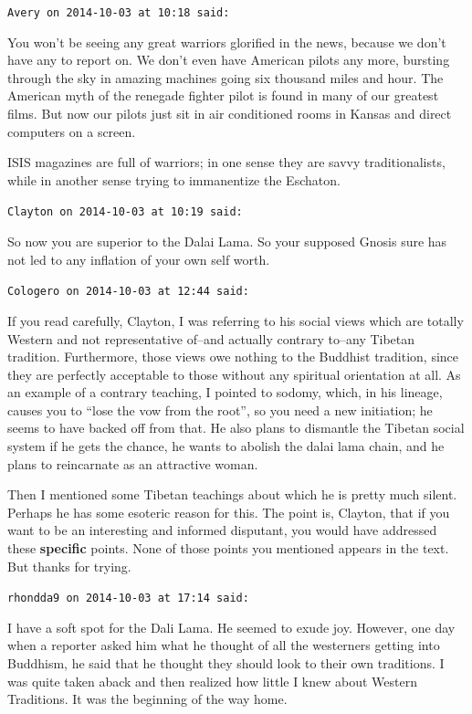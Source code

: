 \begin{footnotesize}
\begin{sffamily}
\texttt{Avery on 2014-10-03 at 10:18 said:}

You won't be seeing any great warriors glorified in the news, because we don't have any to report on. We don't even have American pilots any more, bursting through the sky in amazing machines going six thousand miles and hour. The American myth of the renegade fighter pilot is found in many of our greatest films. But now our pilots just sit in air conditioned rooms in Kansas and direct computers on a screen.

ISIS magazines are full of warriors; in one sense they are savvy traditionalists, while in another sense trying to immanentize the Eschaton.

\hfill

\texttt{Clayton on 2014-10-03 at 10:19 said:}

So now you are superior to the Dalai Lama. So your supposed Gnosis sure has not led to any inflation of your own self worth.

\hfill

\texttt{Cologero on 2014-10-03 at 12:44 said:}

If you read carefully, Clayton, I was referring to his social views which are totally Western and not representative of--and actually contrary to--any Tibetan tradition. Furthermore, those views owe nothing to the Buddhist tradition, since they are perfectly acceptable to those without any spiritual orientation at all. As an example of a contrary teaching, I pointed to sodomy, which, in his lineage, causes you to ``lose the vow from the root'', so you need a new initiation; he seems to have backed off from that. He also plans to dismantle the Tibetan social system if he gets the chance, he wants to abolish the dalai lama chain, and he plans to reincarnate as an attractive woman.

Then I mentioned some Tibetan teachings about which he is pretty much silent. Perhaps he has some esoteric reason for this. The point is, Clayton, that if you want to be an interesting and informed disputant, you would have addressed these \textbf{specific} points. None of those points you mentioned appears in the text. But thanks for trying.

\hfill

\texttt{rhondda9 on 2014-10-03 at 17:14 said:}

I have a soft spot for the Dali Lama. He seemed to exude joy. However, one day when a reporter asked him what he thought of all the westerners getting into Buddhism, he said that he thought they should look to their own traditions. I was quite taken aback and then realized how little I knew about Western Traditions. It was the beginning of the way home.


\end{sffamily}
\end{footnotesize}
